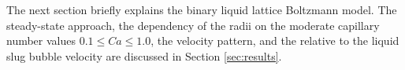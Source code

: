 \documentclass{article}
\begin{document}


The next section briefly explains the binary liquid lattice Boltzmann model.
The steady-state approach, the dependency of the radii on the moderate capillary number values
$0.1\leq Ca \leq 1.0$, the velocity pattern, and the relative to the liquid slug bubble velocity 
are discussed in Section
\ref{sec:results}. 
\end{document}
